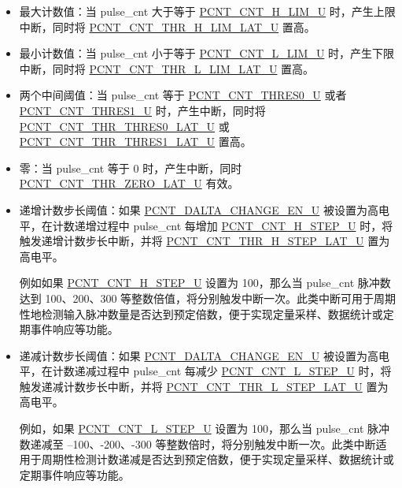 \documentclass[main\_\_CN.tex]{subfiles}
\begin{document}
\begin{itemize}
    \item 最大计数值：当 pulse\_cnt 大于等于 \hyperref[fielddesc:PCNTCNTHLIMUN]{PCNT\_CNT\_H\_LIM\_U} 时，产生上限中断，同时将 \hyperref[fielddesc:PCNTCNTTHRHLIMLATUN]{PCNT\_CNT\_THR\_H\_LIM\_LAT\_U} 置高。
    \item 最小计数值：当 pulse\_cnt 小于等于 \hyperref[fielddesc:PCNTCNTLLIMUN]{PCNT\_CNT\_L\_LIM\_U} 时，产生下限中断，同时将 \hyperref[fielddesc:PCNTCNTTHRLLIMLATUN]{PCNT\_CNT\_THR\_L\_LIM\_LAT\_U} 置高。
    \item 两个中间阈值：当 pulse\_cnt 等于 \hyperref[fielddesc:PCNTCNTTHRES0UN]{PCNT\_CNT\_THRES0\_U} 或者 \hyperref[fielddesc:PCNTCNTTHRES1UN]{PCNT\_CNT\_THRES1\_U} 时，产生中断，同时将 \hyperref[fielddesc:PCNTCNTTHRTHRES0LATUN]{PCNT\_CNT\_THR\_THRES0\_LAT\_U} 或 \hyperref[fielddesc:PCNTCNTTHRTHRES1LATUN]{PCNT\_CNT\_THR\_THRES1\_LAT\_U} 置高。
    \item 零：当 pulse\_cnt 等于 0 时，产生中断，同时 \hyperref[fielddesc:PCNTCNTTHRZEROLATUN]{PCNT\_CNT\_THR\_ZERO\_LAT\_U} 有效。
    \item 递增计数步长阈值：如果 \hyperref[fielddesc:PCNTDALTACHANGEENUN]{PCNT\_DALTA\_CHANGE\_EN\_U} 被设置为高电平，在计数递增过程中 pulse\_cnt 每增加 \hyperref[fielddesc:PCNTCNTHSTEPUN]{PCNT\_CNT\_H\_STEP\_U} 时，将触发递增计数步长中断，并将 \hyperref[fielddesc:PCNTCNTTHRHSTEPLATUN]{PCNT\_CNT\_THR\_H\_STEP\_LAT\_U} 置为高电平。

    例如如果 \hyperref[fielddesc:PCNTCNTHSTEPUN]{PCNT\_CNT\_H\_STEP\_U} 设置为 100，那么当 pulse\_cnt 脉冲数达到 100、200、300 等整数倍值，将分别触发中断一次。此类中断可用于周期性地检测输入脉冲数量是否达到预定倍数，便于实现定量采样、数据统计或定期事件响应等功能。

    \item 递减计数步长阈值：如果 \hyperref[fielddesc:PCNTDALTACHANGEENUN]{PCNT\_DALTA\_CHANGE\_EN\_U} 被设置为高电平，在计数递减过程中 pulse\_cnt 每减少 \hyperref[fielddesc:PCNTCNTLSTEPUN]{PCNT\_CNT\_L\_STEP\_U} 时，将触发递减计数步长中断，并将 \hyperref[fielddesc:PCNTCNTTHRLSTEPLATUN]{PCNT\_CNT\_THR\_L\_STEP\_LAT\_U} 置为高电平。

    例如，如果 \hyperref[fielddesc:PCNTCNTLSTEPUN]{PCNT\_CNT\_L\_STEP\_U} 设置为 100，那么当 pulse\_cnt 脉冲数递减至 --100、-200、-300 等整数倍时，将分别触发中断一次。此类中断适用于周期性检测计数递减是否达到预定倍数，便于实现定量采样、数据统计或定期事件响应等功能。
\end{itemize}
\end{document}
